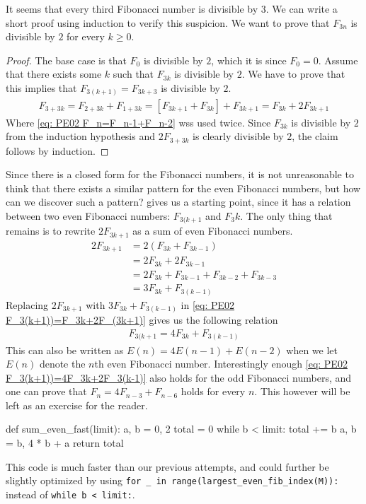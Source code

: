 %
It seems that every third Fibonacci number is divisible by 3. We can write a short proof using induction to verify this suspicion.
We want to prove that $F_{3n}$ is divisible by $2$ for every $k \geq 0$.
%
\begin{proof}
The base case is that $F_0$ is divisible by $2$, which it is since $F_0 = 0$. 
Assume that there exists some $k$ such that $F_{3k}$ is divisible by $2$. We have to prove that this
implies that $F_{3(k+1)} = F_{3k+3}$ is divisible by $2$. 
%
\begin{align}
	\label{eq: PE02 F_3(k+1))=F_3k+2F_(3k+1)}
	F_{3+3k} = F_{2+3k} + F_{1+3k} 
			 = \left[ F_{3k+1} + F_{3k}  \right] + F_{3k+1} 
			 = F_{3k} + 2 F_{3k+1}
\end{align}
%
Where \cref{eq: PE02 F_n=F_n-1+F_n-2} wss used twice.
Since $F_{3k}$ is divisible by $2$ from the induction hypothesis and $2 F_{3+3k}$ is clearly divisible by $2$, the claim follows by induction.
\end{proof}
%
Since there is a closed form for the Fibonacci numbers, it is not unreasonable to think that there exists a similar
pattern for the even Fibonacci numbers, but how can we discover such a pattern? 
gives us a starting point, since it has a relation between two even Fibonacci numbers: $F_{3(k+1}$ and $F_3k$. The
only thing that remains is to rewrite $2 F_{3k+1}$ as a sum of even Fibonacci numbers.
%
\begin{align*}
	    2F_{3k+1} 
	& = 2(F_{3k} + F_{3k-1}) \\
	& = 2F_{3k} + 2 F_{3k-1} \\
	& = 2F_{3k} + F_{3k-1} + F_{3k-2} + F_{3k-3} \\
	& = 3F_{3k} + F_{3(k-1)}
\end{align*}
%
Replacing $2 F_{3k+1}$ with $3 F_{3k} + F_{3(k-1)}$ in \cref{eq: PE02 F_3(k+1))=F_3k+2F_(3k+1)} gives us the following relation
\begin{align}
	\label{eq: PE02 F_3(k+1))=4F_3k+2F_3(k-1)}
	F_{3(k+1} = 4 F_{3k} + F_{3(k-1)}
\end{align}
This can also be written as $E(n) = 4 E(n-1) + E(n-2)$ when we let $E(n)$ denote the $n$th even Fibonacci number.
Interestingly enough \cref{eq: PE02 F_3(k+1))=4F_3k+2F_3(k-1)} also holds for the odd Fibonacci numbers, and 
one can prove that $F_n = 4F_{n-3} + F_{n-6}$ holds for every $n$. This however will be left as an exercise for the reader.
%
\begin{pythoncode}
	def sum_even_fast(limit):
	    a, b = 0, 2
	    total = 0
	    while b < limit:
	        total += b
	        a, b = b, 4 * b + a
	    return total
\end{pythoncode}
%
This code is much faster than our previous attempts, and could further be slightly optimized 
by using \verb|for _ in range(largest_even_fib_index(M)):| instead of \verb|while b < limit:|.

